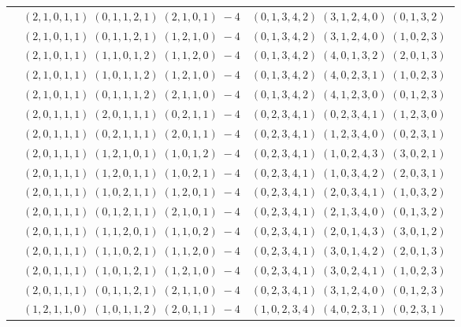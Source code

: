 \documentclass[11pt]{article}
\begin{document}
\begin{longtable}[l]{|c|c|c|}
 \cline{2-3} 
 & $(2 ,1 ,0 ,1 ,1) \;(0 ,1 ,1 ,2 ,1) \;(2 ,1 ,0 ,1) \;-4$ & $(0 ,1 ,3 ,4 ,2) \;(3 ,1 ,2 ,4 ,0) \;(0 ,1 ,3 ,2) \;$\\ 
 \cline{2-3} 
 & $(2 ,1 ,0 ,1 ,1) \;(0 ,1 ,1 ,2 ,1) \;(1 ,2 ,1 ,0) \;-4$ & $(0 ,1 ,3 ,4 ,2) \;(3 ,1 ,2 ,4 ,0) \;(1 ,0 ,2 ,3) \;$\\ 
 \cline{2-3} 
 & $(2 ,1 ,0 ,1 ,1) \;(1 ,1 ,0 ,1 ,2) \;(1 ,1 ,2 ,0) \;-4$ & $(0 ,1 ,3 ,4 ,2) \;(4 ,0 ,1 ,3 ,2) \;(2 ,0 ,1 ,3) \;$\\ 
 \cline{2-3} 
 & $(2 ,1 ,0 ,1 ,1) \;(1 ,0 ,1 ,1 ,2) \;(1 ,2 ,1 ,0) \;-4$ & $(0 ,1 ,3 ,4 ,2) \;(4 ,0 ,2 ,3 ,1) \;(1 ,0 ,2 ,3) \;$\\ 
 \cline{2-3} 
 & $(2 ,1 ,0 ,1 ,1) \;(0 ,1 ,1 ,1 ,2) \;(2 ,1 ,1 ,0) \;-4$ & $(0 ,1 ,3 ,4 ,2) \;(4 ,1 ,2 ,3 ,0) \;(0 ,1 ,2 ,3) \;$\\ 
 \cline{2-3} 
 & $(2 ,0 ,1 ,1 ,1) \;(2 ,0 ,1 ,1 ,1) \;(0 ,2 ,1 ,1) \;-4$ & $(0 ,2 ,3 ,4 ,1) \;(0 ,2 ,3 ,4 ,1) \;(1 ,2 ,3 ,0) \;$\\ 
 \cline{2-3} 
 & $(2 ,0 ,1 ,1 ,1) \;(0 ,2 ,1 ,1 ,1) \;(2 ,0 ,1 ,1) \;-4$ & $(0 ,2 ,3 ,4 ,1) \;(1 ,2 ,3 ,4 ,0) \;(0 ,2 ,3 ,1) \;$\\ 
 \cline{2-3} 
 & $(2 ,0 ,1 ,1 ,1) \;(1 ,2 ,1 ,0 ,1) \;(1 ,0 ,1 ,2) \;-4$ & $(0 ,2 ,3 ,4 ,1) \;(1 ,0 ,2 ,4 ,3) \;(3 ,0 ,2 ,1) \;$\\ 
 \cline{2-3} 
 & $(2 ,0 ,1 ,1 ,1) \;(1 ,2 ,0 ,1 ,1) \;(1 ,0 ,2 ,1) \;-4$ & $(0 ,2 ,3 ,4 ,1) \;(1 ,0 ,3 ,4 ,2) \;(2 ,0 ,3 ,1) \;$\\ 
 \cline{2-3} 
 & $(2 ,0 ,1 ,1 ,1) \;(1 ,0 ,2 ,1 ,1) \;(1 ,2 ,0 ,1) \;-4$ & $(0 ,2 ,3 ,4 ,1) \;(2 ,0 ,3 ,4 ,1) \;(1 ,0 ,3 ,2) \;$\\ 
 \cline{2-3} 
 & $(2 ,0 ,1 ,1 ,1) \;(0 ,1 ,2 ,1 ,1) \;(2 ,1 ,0 ,1) \;-4$ & $(0 ,2 ,3 ,4 ,1) \;(2 ,1 ,3 ,4 ,0) \;(0 ,1 ,3 ,2) \;$\\ 
 \cline{2-3} 
 & $(2 ,0 ,1 ,1 ,1) \;(1 ,1 ,2 ,0 ,1) \;(1 ,1 ,0 ,2) \;-4$ & $(0 ,2 ,3 ,4 ,1) \;(2 ,0 ,1 ,4 ,3) \;(3 ,0 ,1 ,2) \;$\\ 
 \cline{2-3} 
 & $(2 ,0 ,1 ,1 ,1) \;(1 ,1 ,0 ,2 ,1) \;(1 ,1 ,2 ,0) \;-4$ & $(0 ,2 ,3 ,4 ,1) \;(3 ,0 ,1 ,4 ,2) \;(2 ,0 ,1 ,3) \;$\\ 
 \cline{2-3} 
 & $(2 ,0 ,1 ,1 ,1) \;(1 ,0 ,1 ,2 ,1) \;(1 ,2 ,1 ,0) \;-4$ & $(0 ,2 ,3 ,4 ,1) \;(3 ,0 ,2 ,4 ,1) \;(1 ,0 ,2 ,3) \;$\\ 
 \cline{2-3} 
 & $(2 ,0 ,1 ,1 ,1) \;(0 ,1 ,1 ,2 ,1) \;(2 ,1 ,1 ,0) \;-4$ & $(0 ,2 ,3 ,4 ,1) \;(3 ,1 ,2 ,4 ,0) \;(0 ,1 ,2 ,3) \;$\\ 
 \cline{2-3} 
 & $(1 ,2 ,1 ,1 ,0) \;(1 ,0 ,1 ,1 ,2) \;(2 ,0 ,1 ,1) \;-4$ & $(1 ,0 ,2 ,3 ,4) \;(4 ,0 ,2 ,3 ,1) \;(0 ,2 ,3 ,1) \;$\\ 

\end{longtable}
\end{document}
